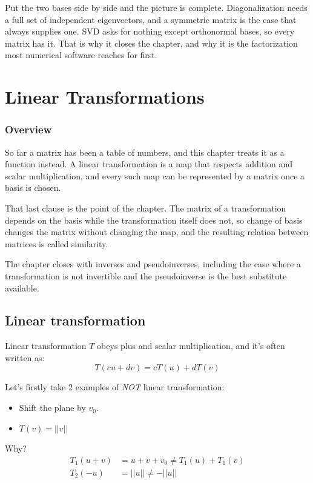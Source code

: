 \documentclass[10pt,a4paper,oneside,numbers=noenddot]{scrbook}
\theoremstyle{ctplain}
\theoremstyle{ctresult}
\begin{document}
Put the two bases side by side and the picture is complete. Diagonalization needs a full set
of independent eigenvectors, and a symmetric matrix is the case that always supplies one.
SVD asks for nothing except orthonormal bases, so every matrix has it. That is why it closes
the chapter, and why it is the factorization most numerical software reaches for first.

\chapter{Linear Transformations}

\subsection*{Overview}

So far a matrix has been a table of numbers, and this chapter treats it as a function
instead. A linear transformation is a map that respects addition and scalar multiplication,
and every such map can be represented by a matrix once a basis is chosen.

That last clause is the point of the chapter. The matrix of a transformation depends on the
basis while the transformation itself does not, so change of basis changes the matrix
without changing the map, and the resulting relation between matrices is called similarity.

The chapter closes with inverses and pseudoinverses, including the case where a
transformation is not invertible and the pseudoinverse is the best substitute available.


\section{Linear transformation}

Linear transformation $T$ obeys plus and scalar multiplication, and it's often written as:
\[
  T(cu + dv) = cT(u) + dT(v)
\]

Let's firstly take 2 examples of \emph{NOT} linear transformation:
\begin{itemize}
  \item Shift the plane by $v_0$.
  \item $T(v) = ||v||$
\end{itemize}

Why?
\begin{align*}
  T_1(u + v) &= u + v + v_0 \neq T_1(u) + T_1(v) \\
  T_2(-u) &= ||u|| \neq -||u||
\end{align*}
\end{document}
